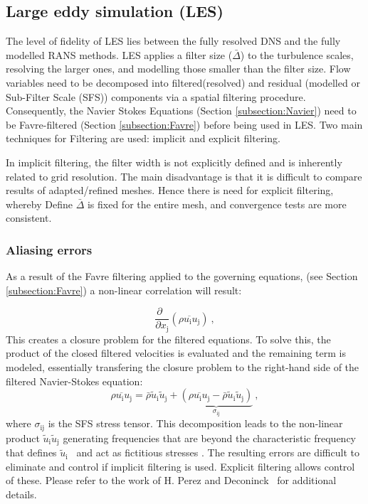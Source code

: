 \subsection{Large eddy simulation (LES)}
The level of fidelity of LES lies between the fully resolved DNS and the fully modelled RANS methods. LES applies a filter size ($\bar{\Delta}$) to the turbulence scales, resolving the larger ones, and modelling those smaller than the filter size. Flow variables need to be decomposed into filtered(resolved) and residual (modelled or Sub-Filter Scale (SFS)) components via a spatial filtering procedure. Consequently, the Navier Stokes Equations (Section \ref{subsection:Navier}) need to be Favre-filtered (Section \ref{subsection:Favre}) before being used in LES. Two main techniques for Filtering are used: implicit and explicit filtering.\par  

In implicit filtering, the filter width is not explicitly defined and is inherently related to grid resolution. The main disadvantage is that it is difficult to compare results of adapted/refined meshes. Hence there is need for explicit filtering, whereby Define $\bar{\Delta} $ is fixed for the entire mesh, and convergence tests are more consistent. \cite{HPerez:2011, Deconinck:2008}


\subsubsection{Aliasing errors} \label{section:aliasing_errors}
As a result of the Favre filtering applied to the governing equations, (see Section \ref{subsection:Favre}) a non-linear correlation will result:\par
\begin{equation}
 \frac{\partial \;\;}{\partial x_\mathrm{j}} (\overline{\rho u_\mathrm{i} u_\mathrm{j}}) \: ,
 \end{equation}
This creates a closure problem for the filtered equations. To solve this, the product of the closed filtered velocities is evaluated and the remaining term is modeled, essentially transfering the closure problem to the right-hand side of the filtered Navier-Stokes equation:
\begin{equation}
\overline{\rho u_\mathrm{i} u_\mathrm{j}} = \bar{\rho} \tilde{u}_\mathrm{i} \tilde{u}_\mathrm{j} 
+\underbrace{ (\overline{\rho u_\mathrm{i} u_\mathrm{j}} - \bar{\rho} \tilde{u}_\mathrm{i} \tilde{u}_\mathrm{j} ) }_{\sigma_\mathrm{ij}} \: ,
\end{equation}
where $\sigma_\mathrm{ij}$ is the SFS stress tensor. This decomposition leads to the non-linear product $\tilde{u}_\mathrm{i} \tilde{u}_\mathrm{j}$ generating frequencies that are beyond the characteristic frequency that defines $\tilde{u}_\mathrm{i}$~ and act as fictitious stresses \cite{Lund:03}.
The resulting errors are difficult to eliminate and control if implicit filtering is used. Explicit filtering allows control of these. Please refer to the work of H. Perez \cite{HPerez:2011} and Deconinck~\cite{Deconinck:2008} for additional details.\par

